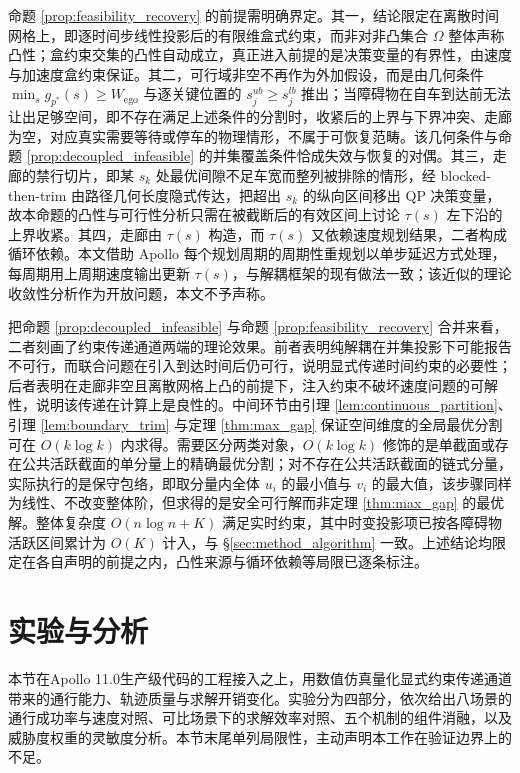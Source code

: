 \documentclass[a4paper,11pt]{ctexart}
\theoremstyle{definition}
\begin{document}
命题 \ref{prop:feasibility_recovery} 的前提需明确界定。其一，结论限定在离散时间网格上，即逐时间步线性投影后的有限维盒式约束，而非对非凸集合 $\Omega$ 整体声称凸性；盒约束交集的凸性自动成立，真正进入前提的是决策变量的有界性，由速度与加速度盒约束保证。其二，可行域非空不再作为外加假设，而是由几何条件 $\min_s g_{p^{*}}(s) \geq W_{\text{ego}}$ 与逐关键位置的 $s_j^{ub} \geq s_j^{lb}$ 推出；当障碍物在自车到达前无法让出足够空间，即不存在满足上述条件的分割时，收紧后的上界与下界冲突、走廊为空，对应真实需要等待或停车的物理情形，不属于可恢复范畴。该几何条件与命题 \ref{prop:decoupled_infeasible} 的并集覆盖条件恰成失效与恢复的对偶。其三，走廊的禁行切片，即某 $s_k$ 处最优间隙不足车宽而整列被排除的情形，经 blocked-then-trim 由路径几何长度隐式传达，把超出 $s_k$ 的纵向区间移出 QP 决策变量，故本命题的凸性与可行性分析只需在被截断后的有效区间上讨论 $\tau(s)$ 左下沿的上界收紧。其四，走廊由 $\tau(s)$ 构造，而 $\tau(s)$ 又依赖速度规划结果，二者构成循环依赖。本文借助 Apollo 每个规划周期的周期性重规划以单步延迟方式处理，每周期用上周期速度输出更新 $\tau(s)$，与解耦框架的现有做法一致；该近似的理论收敛性分析作为开放问题，本文不予声称。

把命题 \ref{prop:decoupled_infeasible} 与命题 \ref{prop:feasibility_recovery} 合并来看，二者刻画了约束传递通道两端的理论效果。前者表明纯解耦在并集投影下可能报告不可行，而联合问题在引入到达时间后仍可行，说明显式传递时间约束的必要性；后者表明在走廊非空且离散网格上凸的前提下，注入约束不破坏速度问题的可解性，说明该传递在计算上是良性的。中间环节由引理 \ref{lem:continuous_partition}、引理 \ref{lem:boundary_trim} 与定理 \ref{thm:max_gap} 保证空间维度的全局最优分割可在 $O(k \log k)$ 内求得。需要区分两类对象，$O(k\log k)$ 修饰的是单截面或存在公共活跃截面的单分量上的精确最优分割；对不存在公共活跃截面的链式分量，实际执行的是保守包络，即取分量内全体 $u_i$ 的最小值与 $v_i$ 的最大值，该步骤同样为线性、不改变整体阶，但求得的是安全可行解而非定理 \ref{thm:max_gap} 的最优解。整体复杂度 $O(n \log n + K)$ 满足实时约束，其中时变投影项已按各障碍物活跃区间累计为 $O(K)$ 计入，与 §\ref{sec:method_algorithm} 一致。上述结论均限定在各自声明的前提之内，凸性来源与循环依赖等局限已逐条标注。

\section{实验与分析}
\label{sec:experiment}

本节在Apollo 11.0生产级代码的工程接入之上，用数值仿真量化显式约束传递通道带来的通行能力、轨迹质量与求解开销变化。实验分为四部分，依次给出八场景的通行成功率与速度对照、可比场景下的求解效率对照、五个机制的组件消融，以及威胁度权重的灵敏度分析。本节末尾单列局限性，主动声明本工作在验证边界上的不足。
\end{document}
